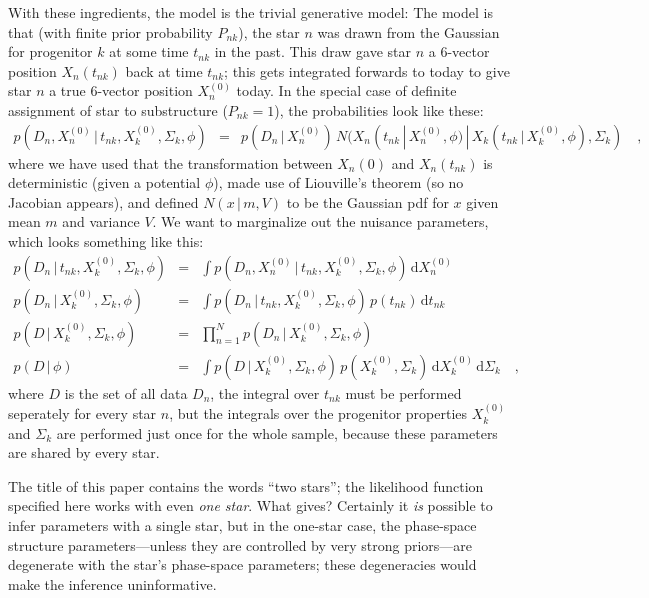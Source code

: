 \documentclass[letterpaper,12pt,preprint]{aastex}
\newcommand{\given}{\,|\,}
\newcommand{\dd}{\mathrm{d}}
\begin{document}
With these ingredients, the model is the trivial generative model: The
model is that (with finite prior probability $P_{nk}$), the star $n$
was drawn from the Gaussian for progenitor $k$ at some time $t_{nk}$
in the past.  This draw gave star $n$ a 6-vector position
$X_n(t_{nk})$ back at time $t_{nk}$; this gets integrated forwards to
today to give star $n$ a true 6-vector position $X_n^{(0)}$ today.  In the special case
of definite assignment of star to substructure ($P_{nk}=1$), the
probabilities look like these:
\begin{eqnarray}
p(D_n, X_n^{(0)}\given t_{nk}, X_k^{(0)}, \Sigma_k, \phi) &=&
  p(D_n\given X_n^{(0)})\,N(X_n(t_{nk}\given X_n^{(0)}, \phi)\given X_k(t_{nk}\given X_k^{(0)}, \phi), \Sigma_k)
\quad ,
\end{eqnarray}
where we have used that the transformation between $X_n(0)$ and
$X_n(t_{nk})$ is deterministic (given a potential $\phi$), made use of
Liouville's theorem (so no Jacobian appears), and defined $N(x\given
m, V)$ to be the Gaussian pdf for $x$ given mean $m$ and variance $V$.
We want to marginalize out the nuisance parameters, which looks
something like this:
\begin{eqnarray}
p(D_n\given t_{nk}, X_k^{(0)}, \Sigma_k, \phi) &=&
  \int p(D_n, X_n^{(0)}\given t_{nk}, X_k^{(0)}, \Sigma_k, \phi)\,\dd X_n^{(0)}
\\
p(D_n\given X_k^{(0)}, \Sigma_k, \phi) &=&
  \int p(D_n\given t_{nk}, X_k^{(0)}, \Sigma_k, \phi)
  \,p(t_{nk})\,\dd t_{nk}
\\
p(D\given X_k^{(0)}, \Sigma_k, \phi) &=&
  \prod_{n=1}^N p(D_n\given X_k^{(0)}, \Sigma_k, \phi)
\\
p(D\given \phi) &=&
  \int p(D\given X_k^{(0)}, \Sigma_k, \phi)\,p(X_k^{(0)}, \Sigma_k)\,\dd X_k^{(0)}\,\dd\Sigma_k
\quad ,
\end{eqnarray}
where $D$ is the set of all data $D_n$, the integral over $t_{nk}$
must be performed seperately for every star $n$, but the integrals
over the progenitor properties $X_k^{(0)}$ and $\Sigma_k$ are
performed just once for the whole sample, because these parameters are
shared by every star.

The title of this paper contains the words ``two stars''; the
likelihood function specified here works with even \emph{one star}.
What gives?  Certainly it \emph{is} possible to infer parameters
with a single star, but in the one-star case, the phase-space
structure parameters---unless they are controlled by very strong
priors---are degenerate with the star's phase-space parameters; these
degeneracies would make the inference uninformative.
\end{document}
